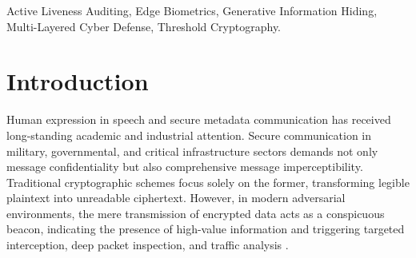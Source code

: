 \documentclass[conference]{IEEEtran}
\begin{document}
\begin{abstract}
This study introduces a multi-layered, dynamic cyber defense framework. Applied cryptography, edge biometrics, and generative information hiding were employed to overcome the single point-of-compromise issue. Confidentiality of the payload is achieved using Advanced Encryption Standard in Galois/Counter Mode encryption, whereas key security is attained via a $(k,n)$ threshold secret sharing approach defined in the Galois Field $GF(2^8)$. The key pieces are disguised within the discrete wavelet transform coefficients of generative diffusion models, creating carrier images on the fly and negating the need to match the cover source. A parallel spatial least significant bit layer holds decoy information to create a misleading ``Russian Doll'' pose and dupe probing systems. User verification is conducted locally at the edge using lib-based 128-dimensional facial representation embeddings and active temporal liveness testing, which avoids cloud biometric storage. Contextual threats are monitored in real time, and session geolocations are checked with increasing levels of verification required, from purely biometric testing to the use of Rivest-Shamir-Adleman-2048 cryptography signatures for high-risk scores. Through empirical analysis, it has been demonstrated that the solution ensures perfect secrecy up to the threshold value and is resistant to convolutional self-analysis. Furthermore, the key reconstruction time achieved was in the microsecond range, proving its utility as a decentralized communication solution.
\end{abstract}

\begin{IEEEkeywords}
Active Liveness Auditing, Edge Biometrics, Generative Information Hiding, Multi-Layered Cyber Defense, Threshold Cryptography.
\end{IEEEkeywords}

\IEEEpeerreviewmaketitle

\section{Introduction}
Human expression in speech and secure metadata communication has received long-standing academic and industrial attention. Secure communication in military, governmental, and critical infrastructure sectors demands not only message confidentiality but also comprehensive message imperceptibility. Traditional cryptographic schemes focus solely on the former, transforming legible plaintext into unreadable ciphertext. However, in modern adversarial environments, the mere transmission of encrypted data acts as a conspicuous beacon, indicating the presence of high-value information and triggering targeted interception, deep packet inspection, and traffic analysis \cite{cryptConsp}.
\end{document}
